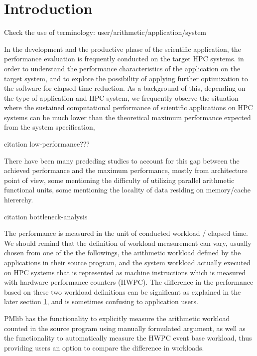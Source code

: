 \documentclass[conference]{IEEEtran}
\begin{document}
\section{Introduction}
{\color{blue} Check the use of terminology: user/arithmetic/application/system}


In the development and the productive phase of the scientific application,
the performance evaluation is frequently conducted on the target HPC systems.
in order to understand the performance characteristics
of the application on the target system, and to explore the possibility of
applying further optimization to the software for elapsed time reduction.
As a background of this,
depending on the type of application and HPC system,
we frequently observe the situation where
the sustained computational performance of scientific applications on HPC
systems can be much lower than the theoretical maximum performance
expected from the system specification,

{\color{blue} citation low-performance???}

There have been many prededing studies to account for this gap between
the achieved performance and the maximum performance, mostly from architecture
point of view,
some mentioning the difficulty of utilizing parallel arithmetic functional units,
some mentioning the locality of data residing on memory/cache hiererchy.

{\color{blue} citation bottleneck-analysis}

The performance is measured in the unit of conducted workload / elapsed time.
We should remind that the definition of workload measurement can vary,
usually chosen from one of the the followings,
the arithmetic workload defined by the applications in their source program,
and the system workload actually executed on HPC systems that is represented as
machine instructions which is measured with hardware performance counters (HWPC).
The difference in the performance based on these two workload definitions
can be significant as explained in the later section \ref{},
and is sometimes confusing to application users.


PMlib has the functionality
to explicitly measure the arithmetic workload counted in the source program
using manually formulated argument, as well as the functionality
to automatically measure the HWPC event base workload,
thus providing users an option to compare the difference in workloads.
\end{document}
